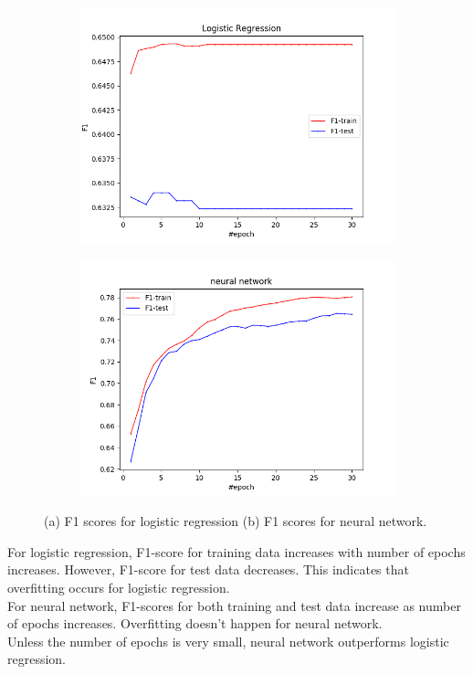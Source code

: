 \documentclass{article}
\begin{document}
\begin{figure}[h!]
  \centering
  \begin{subfigure}[b]{0.45\linewidth}
    \includegraphics[width=\linewidth]{logistic_F1.png}
    \caption{}
  \end{subfigure}
  \begin{subfigure}[b]{0.45\linewidth}
    \includegraphics[width=\linewidth]{nnet_F1.png}
    \caption{}
      \end{subfigure}
  \caption{(a) F1 scores for logistic regression (b) F1 scores for neural network.} 
  \label{lj}
 \end{figure}

For logistic regression, F1-score for training data increases with number of epochs increases. However, F1-score for test data decreases. This indicates that overfitting occurs for logistic regression.\\
For neural network, F1-scores for both training and test data increase as number of epochs increases. Overfitting doesn't happen for neural network.\\
Unless the number of epochs is very small, neural network outperforms logistic regression.
\end{document}
